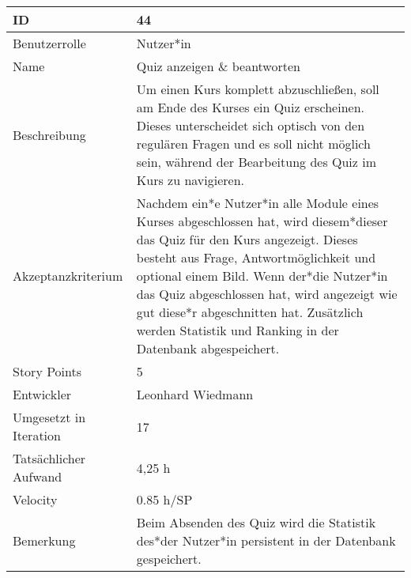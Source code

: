 \begin{tabularx}{\textwidth}{|p{}|X|}
	\hline
	ID & 44\\
	\hline
	Benutzerrolle & Nutzer*in\\
	\hline
	Name & Quiz anzeigen \& beantworten\\
	\hline
	Beschreibung & Um einen Kurs komplett abzuschließen, soll am Ende des Kurses ein Quiz erscheinen. Dieses unterscheidet sich optisch von den regulären Fragen und es soll nicht möglich sein, während der Bearbeitung des Quiz im Kurs zu navigieren.\\
	\hline
	Akzeptanzkriterium & Nachdem ein*e Nutzer*in alle Module eines Kurses abgeschlossen hat, wird diesem*dieser das Quiz für den Kurs angezeigt. Dieses besteht aus Frage, Antwortmöglichkeit und optional einem Bild. Wenn der*die Nutzer*in das Quiz abgeschlossen hat, wird angezeigt wie gut diese*r abgeschnitten hat. Zusätzlich werden Statistik und Ranking in der Datenbank abgespeichert.\\
	\hline
	Story Points & 5\\
	\hline
	Entwickler & Leonhard Wiedmann\\
	\hline
	Umgesetzt in Iteration & 17\\
	\hline
	Tatsächlicher Aufwand & 4,25 h\\
	\hline
	Velocity & 0.85 h/SP\\
	\hline
	Bemerkung & Beim Absenden des Quiz wird die Statistik des*der Nutzer*in persistent in der Datenbank gespeichert.\\
	\hline
\end{tabularx}
\vspace{20pt}

